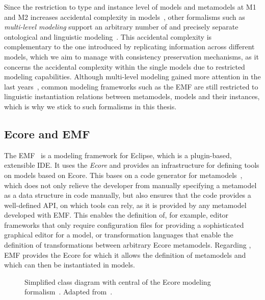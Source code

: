 Since the restriction to type and instance level of models and metamodels at M1 and M2 increases accidental complexity in models~\cite{atkinson2008reducingAccidentalComplexity-SoSym}, other formalisms such as \emph{multi-level modeling} support an arbitrary number of \metalevels and precisely separate ontological and linguistic modeling~\cite{atkinson2003mdd-Software}.
This accidental complexity is complementary to the one introduced by replicating information across different models, which we aim to manage with consistency preservation mechanisms, as it concerns the accidental complexity within the single models due to restricted modeling capabilities.
Although multi-level modeling gained more attention in the last years~\cite{atkinson2014multilevel-MLM}, common modeling frameworks such as the \acrlong{EMF} are still restricted to linguistic instantiation relations between metamodels, models and their instances, which is why we stick to such formalisms in this thesis.


\subsection{Ecore and EMF}
\label{chap:foundations:formalisms:ecore}

The \gls{EMF}~\cite{steinberg2009emf} is a modeling framework for Eclipse, which is a plugin-based, extensible \gls{IDE}.
It uses the \metametamodel \emph{Ecore} and provides an infrastructure for defining tools on models based on Ecore.
This bases on a code generator for metamodels~\cite[pp.~237]{steinberg2009emf}, which does not only relieve the developer from manually specifying a metamodel as a data structure in code manually, but also ensures that the code provides a well-defined \gls{API}, on which tools can rely, as it is provided by any metamodel developed with \gls{EMF}.
This enables the definition of, for example, editor frameworks that only require configuration files for providing a sophisticated graphical editor for a model, or transformation languages that enable the definition of transformations between arbitrary Ecore metamodels.
Regarding \metalevels, \gls{EMF} provides the Ecore \metametamodel for which it allows the definition of metamodels and which can then be instantiated in models.

\begin{figure}
    \centering
    
    \caption[Relevant subset of the Ecore modeling formalism]{Simplified class diagram with central \metaclasses of the Ecore modeling formalism~\cite[p.~107]{steinberg2009emf}. Adapted from~\cite[Fig.~2.3]{kramer2017a}.}
    \label{fig:foundations:ecore}
\end{figure}

